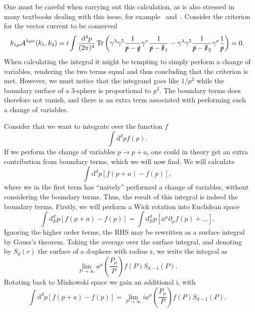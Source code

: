 One must be careful when carrying out this calculation, as is also stressed in many textbooks dealing with this issue, for example~\cite{kachelriessQuantumFieldsHubble2018} and~\cite{zeeQuantumFieldTheory2010}.
Consider the criterion for the vector current to be conserved
\begin{equation}
  \label{eq:criterion-conserved}
  k_{1\mu } \mathcal{A} ^{\lambda \mu \nu } (k_1, k_2) =
  i\int \frac{\mathrm{d}^4p}{ (2\pi)^{4}}
  \operatorname{Tr}\left(
    \gamma ^{\lambda } \gamma ^5 \frac{1}{\slashed{p} - \slashed{q}} \gamma ^{\nu}
    \frac{1}{\slashed{p} - \slashed{k}_{1}}
    -
    \gamma ^{\lambda }\gamma ^5 \frac{1}{\slashed{p} -\slashed{k}_{2}} \gamma ^{\nu }\frac{1}{\slashed{p}}
  \right)
  = 0.
\end{equation}
When calculating the integral it might be tempting to simply perform a change of variables, rendering the two terms equal and thus concluding that the criterion  is met.
However, we must notice that the integrand goes like $1 / p^2$ while the boundary surface of a 3-sphere is proportional to $p^3$.
The boundary terms does therefore not vanish, and there is an extra term associated with performing such a change of variables.

Consider that we want to integrate over the function $f$
\begin{equation}
  \int \mathrm{d}^dp f(p).
\end{equation}
If we perform the change of variables $p \to p+a$, one could in theory get an extra contribution from boundary terms, which we will now find.
We will calculate
\begin{equation}
  \int \mathrm{d}^dp \left[ f(p+a) - f(p) \right],
\end{equation}
where we in the first term has ``naively'' performed a change of variables, without considering the boundary terms.
Thus, the result of this integral is indeed the boundary terms.
Firstly, we will perform a Wick rotation into Euclidean space
\begin{equation}
  \int \mathrm{d}^d_Ep \left[ f(p+a) - f(p) \right]
  = \int \mathrm{d}_E^d p \left[ a^{\mu }\partial_{\mu} f(p) + \dots \right].
\end{equation}
Ignoring the higher order terms, the RHS may be rewritten as a surface integral by Gauss's theorem.
Taking the average over the surface integral, and denoting by $S_d(r)$ the surface of a d-sphere with radius r, we write the integral as
\begin{equation}
  \lim_{P\to \infty } a^{\mu } \left( \frac{P_{\mu }}{P} \right) f(P) S_{d-1}(P).
\end{equation}
Rotating back to Minkowski space we gain an additional i, with
\begin{equation}
  \label{eq:shift-trickery}
  \int \mathrm{d}^{d}p \left[ f(p+a) - f(p) \right]
  = \lim_{P\to \infty } ia^{\mu } \left( \frac{P_{\mu }}{P} \right) f(P) S_{d-1}(P).
\end{equation}

